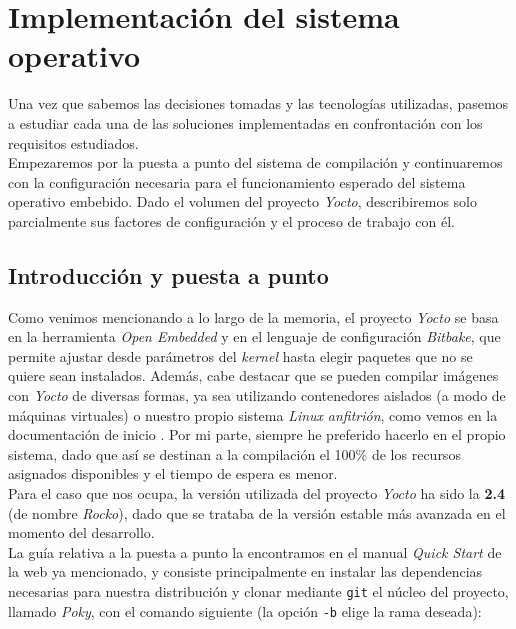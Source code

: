 \chapter{Implementación del sistema operativo}

Una vez que sabemos las decisiones tomadas y las tecnologías utilizadas, pasemos a estudiar cada una de las soluciones implementadas en confrontación con los requisitos estudiados.\\

Empezaremos por la puesta a punto del sistema de compilación y continuaremos con la configuración necesaria para el funcionamiento esperado del sistema operativo embebido. Dado el volumen del proyecto \textit{Yocto}, describiremos solo parcialmente sus factores de configuración y el proceso de trabajo con él.

\section{Introducción y puesta a punto}

Como venimos mencionando a lo largo de la memoria, el proyecto \textit{Yocto} se basa en la herramienta \textit{Open Embedded} y en el lenguaje de configuración \textit{Bitbake}, que permite ajustar desde parámetros del \textit{kernel} hasta elegir paquetes que no se quiere sean instalados. Además, cabe destacar que se pueden compilar imágenes con \textit{Yocto} de diversas formas, ya sea utilizando contenedores aislados (a modo de máquinas virtuales) o nuestro propio sistema \textit{Linux} \textit{anfitrión}, como vemos en la documentación de inicio \cite{yocto-project-quick-start-build-system}. Por mi parte, siempre he preferido hacerlo en el propio sistema, dado que así se destinan a la compilación el 100\% de los recursos asignados disponibles y el tiempo de espera es menor.\\

Para el caso que nos ocupa, la versión utilizada del proyecto \textit{Yocto} ha sido la \textbf{2.4} (de nombre \textit{Rocko}), dado que se trataba de la versión estable más avanzada en el momento del desarrollo.\\

La guía relativa a la puesta a punto la encontramos en el manual \textit{Quick Start} de la web \cite{yocto-project-quick-start} ya mencionado, y consiste principalmente en instalar las dependencias necesarias para nuestra distribución y clonar mediante \texttt{git} el núcleo del proyecto, llamado \textit{Poky}, con el comando siguiente (la opción \texttt{-b} elige la rama deseada):

